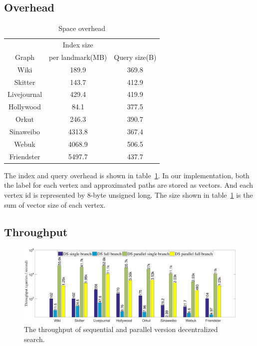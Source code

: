 \subsection{Overhead}
\label{eval_overhead}

\begin{table}
		\caption{Space overhead}
		\vspace{2 mm}
    \label{table:ioh}
    \centering
    \begin{tabular}{c|cc} \hline
				&Index size&\\
				Graph&per landmark(MB)&Query size(B)\\ \hline
				Wiki&189.9&369.8 \\ 
				Skitter&143.7&412.9 \\ 
				Livejournal&429.4&419.9 \\ 
				Hollywood&84.1&377.5 \\ 
				Orkut&246.3&390.7 \\ 
				Sinaweibo&4313.8&367.4 \\ 
				Webuk&4068.9&506.5 \\ 
				Friendster&5497.7&437.7 \\ \hline
    \end{tabular}
\end{table}

The index and query overhead is shown in table~\ref{table:ioh}. In our implementation, both the label for each vertex and approximated paths are stored as vectors. And each vertex id is represented by 8-byte unsigned long. The size shown in table~\ref{table:ioh} is the sum of vector size of each vertex. 

\subsection{Throughput}
\label{eval_throughput}

\begin{figure}[ht]
		\vspace{-0.5cm}
    \centering
    \includegraphics[width=0.95\linewidth]{./figures/throughput.pdf}
    \caption{The throughput of sequential and parallel version decentralized search.}
    \label{fig:throughput}
		\vspace{-0.5cm}
\end{figure}

